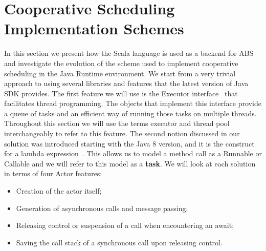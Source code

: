 \section{Cooperative Scheduling Implementation Schemes}
\label{scheme}

In this section we present how the Scala language is used as a backend for ABS and investigate the evolution of the scheme used to implement cooperative scheduling in the Java Runtime environment. We start  from a very trivial approach to using several libraries and features that the latest version of Java SDK provides. The first feature we will use is the Executor interface~\cite{execserv} that facilitates thread programming. The objects that implement this interface provide a queue of tasks and an efficient way of running those tasks on multiple threads. Throughout this section we will use the terms executor and thread pool interchangeably to refer to this feature. The second notion discussed in our solution was introduced starting with the Java 8 version, and it is the construct for a lambda expression~\cite{lambdas}. This allows us to model a method call as a Runnable or Callable and we will refer to this model as a \textbf{task}. We will look at each solution in terms of four Actor features:

\begin{itemize}
	\item Creation of the actor itself;
	\item Generation of asynchronous calls and message passing;
	\item Releasing control or suspension of a call when encountering an await;
	\item Saving the call stack of a synchronous call upon releasing control.
\end{itemize}




